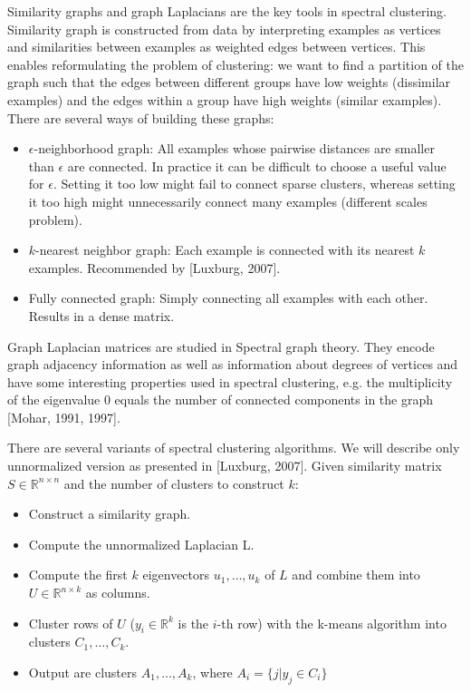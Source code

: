 \documentclass[conference]{IEEEtran}
\begin{document}
Similarity graphs and graph Laplacians are the key tools in spectral clustering.
Similarity graph is constructed from data by interpreting examples as vertices and similarities
between examples as weighted edges between vertices. This enables reformulating the problem
of clustering: we want to find a partition of the graph such that the edges between different groups
have low weights (dissimilar examples) and the edges within a group have high weights (similar examples).
There are several ways of building these graphs:
\begin{itemize}
    \item $\epsilon$-neighborhood graph: All examples whose pairwise distances are smaller than $\epsilon$
    are connected. In practice it can be difficult to choose a useful value for $\epsilon$. Setting it too
    low might fail to connect sparse clusters, whereas setting it too high might unnecessarily connect many
    examples (different scales problem).
    \item $k$-nearest neighbor graph: Each example is connected with its nearest $k$ examples. Recommended
    by [Luxburg, 2007].
    \item Fully connected graph: Simply connecting all examples with each other. Results in a dense matrix.
\end{itemize}

Graph Laplacian matrices are studied in Spectral graph theory. They encode graph adjacency information
as well as information about degrees of vertices and have some interesting properties used in spectral
clustering, e.g. the multiplicity of the eigenvalue 0 equals the number of connected components in the graph
[Mohar, 1991, 1997].

There are several variants of spectral clustering algorithms. We will describe only unnormalized version
as presented in [Luxburg, 2007]. Given similarity matrix $S \in \mathbb{R}^{n \times n}$ and the number
of clusters to construct $k$:

\begin{itemize}
    \item Construct a similarity graph.
    \item Compute the unnormalized Laplacian L.
    \item Compute the first $k$ eigenvectors $u_1, \dots, u_k$ of $L$ and combine them into
    $U \in \mathbb{R}^{n \times k}$ as columns.
    \item Cluster rows of $U$ ($y_i \in \mathbb{R}^k$ is the $i$-th row) with the k-means algorithm
    into clusters $C_1, \dots, C_k$.
    \item Output are clusters $A_1, \dots, A_k$, where $A_i = \{ j|y_j \in C_i \}$
\end{itemize}
\end{document}
